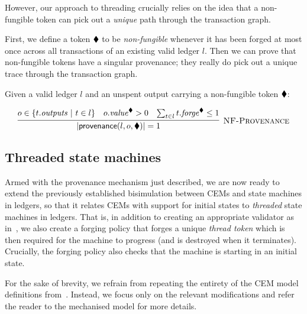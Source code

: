 However, our approach to threading crucially relies on the idea that a
non-fungible token can pick out a \emph{unique} path through the
transaction graph.

First, we define a token $\blacklozenge$ to be \textit{non-fungible} whenever
it has been forged at most once across all transactions of an existing
valid ledger $l$.
Then we can prove that non-fungible tokens have a singular provenance;
they really do pick out a unique trace through the transaction graph.

\begin{proposition}
Given a valid ledger $l$ and an unspent output carrying a non-fungible
token $\blacklozenge$:

\begin{displaymath}
\infer[\textsc{NF-Provenance}]
  {|\provenance(l, o, \nft)| = 1}
  {%
    o \in \{ t.\outputs \ | \ t \in l \}
  & o.\val^\nft > 0
  & \sum_{t \in l} t.\forge^\nft \leq 1
  }
\end{displaymath}
\end{proposition}

\subsection{Threaded state machines}

Armed with the provenance mechanism just described, we are now ready
to extend the previously established bisimulation between CEMs and
state machines in ledgers, so that it relates CEMs with support for
initial states to \textit{threaded} state machines in ledgers.  That
is, in addition to creating an appropriate validator as
in~\cite{eutxo-1-paper}, we also create a forging policy that forges
a unique \textit{thread token} which is then required for the
machine to progress (and is destroyed when it terminates).  Crucially,
the forging policy also checks that the machine is starting in an
initial state.

For the sake of brevity, we refrain from repeating the entirety of
the CEM model definitions from~\cite{eutxo-1-paper}.
Instead, we focus only on the relevant modifications and refer
the reader to the mechanised model for more details.

